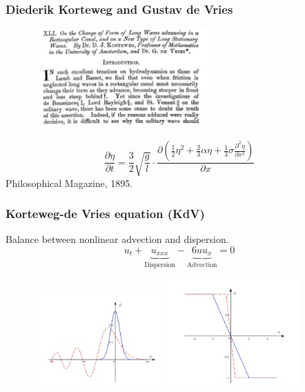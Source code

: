 \documentclass[16pt]{beamer}
\begin{document}
\begin{frame}
\frametitle{Diederik Korteweg and Gustav de Vries}
\begin{figure}[H]
\centering
\includegraphics[width=0.6\textwidth]{images/KdVtitle2.png}
\end{figure}
\[
\frac{\partial \eta}{\partial t} = \frac{3}{2} \sqrt{\frac{g}{l}}\cdot
\frac{\partial
\left( \frac{1}{2} \eta^2 + \frac{2}{3} \alpha \eta + \frac{1}{3} \sigma \frac{\partial^2 \eta}{\partial x^2}\right)}{\partial x}
\]
Philosophical Magazine, 1895.
\end{frame}

\begin{frame}
\frametitle{Korteweg-de Vries equation (KdV)}
\fontsize{16}{7.2}\selectfont
Balance between nonlinear advection and dispersion.
\[
u_t + \underbrace{u_{xxx}}_{\text{Dispersion}} - \underbrace{6 u u_x}_{\text{Advection}} 
= 0
\]
\begin{figure}[H]
\includegraphics[width=0.45\textwidth]{images/dispersion.png}
\includegraphics[width=0.45\textwidth]{images/nladvection.png}
\end{figure}
\end{frame}
\end{document}

